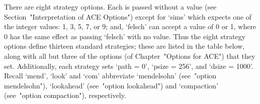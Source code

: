 There are eight strategy options. Each is passed without a value  (see
Section~"Interpretation of  ACE  Options")  except  for  `sims'  which
expects one of the integer values: 1, 3, 5, 7, or 9; and, `felsch' can
accept a value of 0 or 1, where 0  has  the  same  effect  as  passing
`felsch' with  no  value.  Thus  the  eight  strategy  options  define
thirteen standard strategies; these are listed  in  the  table  below,
along with all but three of the options (of Chapter~"Options for ACE")
that they set. Additionally, each strategy sets `path = 0',  `psize  =
256', and `dsize = 1000'. Recall `mend', `look' and  `com'  abbreviate
`mendelsohn'  (see~"option  mendelsohn"),   `lookahead'   (see~"option
lookahead") and `compaction' (see~"option compaction"), respectively.


